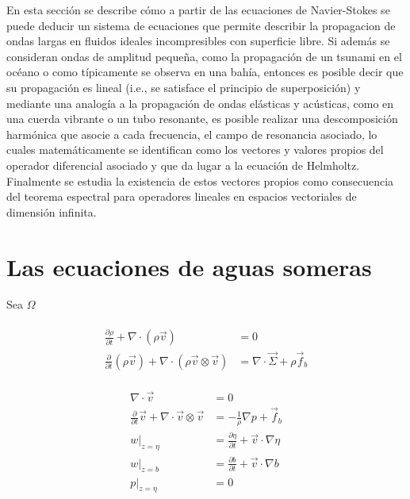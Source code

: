 En esta secci\'on se describe c\'omo a partir de las ecuaciones de Navier-Stokes se puede deducir un sistema de ecuaciones que permite describir la propagacion de ondas largas en fluidos ideales incompresibles con superficie libre. Si adem\'as se consideran ondas de amplitud peque\~na, como la propagaci\'on de un tsunami en el oc\'eano o como t\'ipicamente se observa en una bah\'ia, entonces es posible decir que su propagaci\'on es lineal (i.e., se satisface el principio de superposici\'on) y mediante una analog\'ia a la propagaci\'on de ondas el\'asticas y ac\'usticas, como en una cuerda vibrante o un tubo resonante, es posible realizar una descomposici\'on harm\'onica que asocie a cada frecuencia, el campo de resonancia asociado, lo cuales matem\'aticamente se identifican como los vectores y valores propios del operador diferencial asociado y que da lugar a la ecuaci\'on de Helmholtz. Finalmente se estudia la existencia de estos vectores propios como consecuencia del teorema espectral para operadores lineales en espacios vectoriales de dimensi\'on infinita.

\section{Las ecuaciones de aguas someras}

Sea $\Omega$

\begin{align}
  \begin{split}
    \frac{\partial \rho}{\partial t} + \nabla \cdot (\rho \vec v) &= 0 \\
    \frac{\partial }{\partial t}(\rho \vec v) + \nabla \cdot ( \rho \vec v \otimes \vec v ) &= \nabla \cdot \vec \Sigma + \rho \vec f_b
  \end{split}
  \label{NS-compresible}
\end{align}

\begin{align}
  \begin{split}
    \nabla \cdot \vec v &= 0 \\
    \frac{\partial }{\partial t}\vec v + \nabla \cdot \vec v \otimes \vec v  &= -\frac{1}{\rho}\nabla p + \vec f_b    \\
    w|_{z=\eta	} &= \frac{\partial \eta}{\partial t}+\vec v \cdot \nabla \eta \\
    w|_{z=b} &= \frac{\partial b}{\partial t} + \vec v \cdot \nabla b \\    
    p|_{z = \eta} &= 0
  \end{split}
  \label{NS-incompresible}
\end{align}

